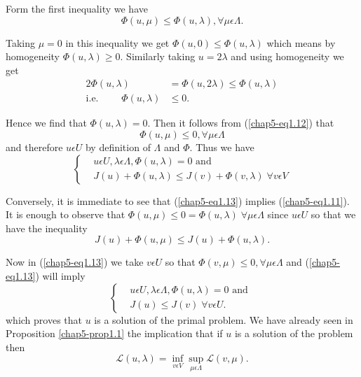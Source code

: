 Form the first inequality we have
\begin{equation*}
\Phi (u, \mu) \leq \Phi (u, \lambda), \forall \mu \epsilon \Lambda.\tag{1.12}\label{chap5-eq1.12}
\end{equation*}

Taking $\mu = 0$ in this inequality we get $\Phi (u, 0) \leq \Phi (u, \lambda)$ which means by homogeneity $\Phi (u, \lambda) \geq 0$. Similarly taking $u = 2\lambda$ and using homogeneity we get
\begin{align*}
2 \Phi (u, \lambda) & = \Phi(u, 2\lambda) \leq \Phi(u, \lambda)\\
\text{i.e. }\qquad \Phi(u, \lambda) & \leq 0.
\end{align*}

Hence we find that $\Phi(u, \lambda) = 0$. Then it follows from (\ref{chap5-eq1.12}) that
$$
\Phi (u, \mu) \leq 0, \forall \mu \epsilon \Lambda
$$
and therefore $u \epsilon U$ by definition of $\Lambda$ and $\Phi$. Thus we have
\begin{equation*}
\begin{cases}
& u \epsilon U, \lambda \epsilon \Lambda, \Phi(u, \lambda) = 0 \text{ and }\\
& J(u) + \Phi (u, \lambda) \leq J(v) + \Phi(v, \lambda) \; \forall v \epsilon V\tag{1.13}\label{chap5-eq1.13}
\end{cases}
\end{equation*}

Conversely, it is immediate to see that (\ref{chap5-eq1.13}) implies
(\ref{chap5-eq1.11}). It is enough to observe that $\Phi (u, \mu) \leq
0 = \Phi(u, \lambda) \; \forall \mu \epsilon \Lambda$ since $u
\epsilon U$ so that we have the inequality  
$$
J(u) + \Phi (u, \mu) \leq J(u) + \Phi (u, \lambda).
$$

Now in (\ref{chap5-eq1.13}) we take $v \epsilon U$ so that $\Phi(v, \mu) \leq 0, \forall \mu \epsilon \Lambda$ and (\ref{chap5-eq1.13}) will imply
\begin{equation*}
\begin{cases}
& u \epsilon U, \lambda \epsilon \Lambda, \Phi (u, \lambda) = 0\text{ and }\\
& J(u) \leq J(v) \; \forall v \epsilon U.
\end{cases} \tag{1.14}\label{chap5-eq1.14}
\end{equation*}
which proves that $u$ is a solution of the primal problem. We have already seen in Proposition \ref{chap5-prop1.1} the implication that if $u$ is a solution of the problem then
$$
\mathscr{L} (u, \lambda) = \inf_{v \epsilon V} \sup_{\mu \epsilon \Lambda} \mathscr{L} (v, \mu).
$$\pageoriginale

